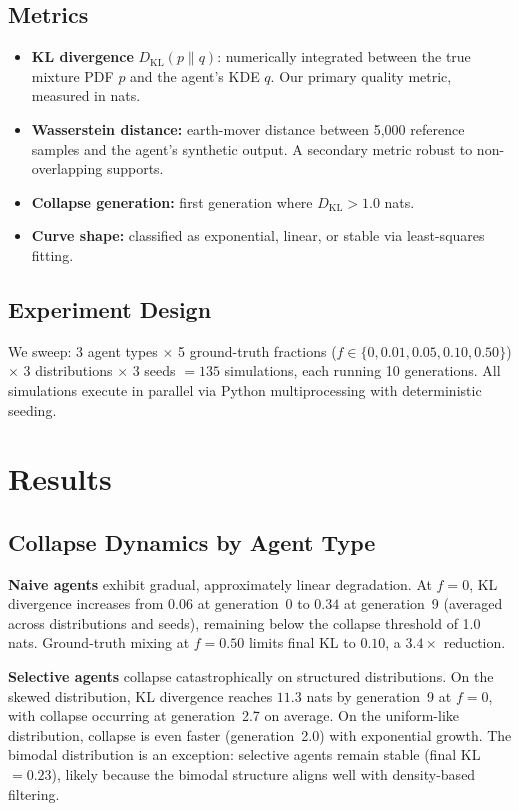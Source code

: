 \documentclass[11pt]{article}
\begin{document}
\subsection{Metrics}

\begin{itemize}
  \item \textbf{KL divergence} $D_\text{KL}(p \| q)$: numerically integrated between the true mixture PDF $p$ and the agent's KDE $q$.  Our primary quality metric, measured in nats.
  \item \textbf{Wasserstein distance:} earth-mover distance between 5{,}000 reference samples and the agent's synthetic output.  A secondary metric robust to non-overlapping supports.
  \item \textbf{Collapse generation:} first generation where $D_\text{KL} > 1.0$ nats.
  \item \textbf{Curve shape:} classified as exponential, linear, or stable via least-squares fitting.
\end{itemize}

\subsection{Experiment Design}

We sweep: 3 agent types $\times$ 5 ground-truth fractions ($f \in \{0, 0.01, 0.05, 0.10, 0.50\}$) $\times$ 3 distributions $\times$ 3 seeds $= 135$ simulations, each running 10 generations.
All simulations execute in parallel via Python multiprocessing with deterministic seeding.

\section{Results}

\subsection{Collapse Dynamics by Agent Type}

\textbf{Naive agents} exhibit gradual, approximately linear degradation.
At $f=0$, KL divergence increases from $0.06$ at generation~0 to $0.34$ at generation~9 (averaged across distributions and seeds), remaining below the collapse threshold of 1.0 nats.
Ground-truth mixing at $f=0.50$ limits final KL to $0.10$, a $3.4\times$ reduction.

\textbf{Selective agents} collapse catastrophically on structured distributions.
On the skewed distribution, KL divergence reaches $11.3$ nats by generation~9 at $f=0$, with collapse occurring at generation~2.7 on average.
On the uniform-like distribution, collapse is even faster (generation~2.0) with exponential growth.
The bimodal distribution is an exception: selective agents remain stable (final KL $= 0.23$), likely because the bimodal structure aligns well with density-based filtering.
\end{document}
